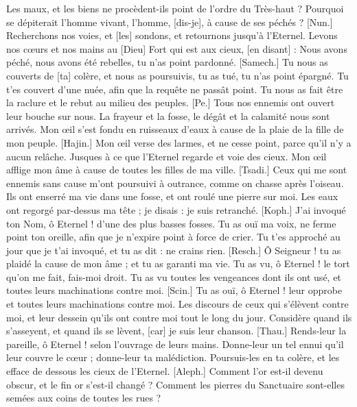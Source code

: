 \begin{multicols}{2}
Les maux, et les biens ne procèdent-ils point de l’ordre du Très-haut ?
Pourquoi se dépiterait l’homme vivant, l’homme, [dis-je], à cause de ses péchés ?
[Nun.] Recherchons nos voies, et [les] sondons, et retournons jusqu’à l’Eternel.
Levons nos cœurs et nos mains au [Dieu] Fort qui est aux cieux, [en disant] :
Nous avons péché, nous avons été rebelles, tu n’as point pardonné.
[Samech.] Tu nous as couverts de [ta] colère, et nous as poursuivis, tu as tué, tu n’as point épargné.
Tu t’es couvert d’une nuée, afin que la requête ne passât point.
Tu nous as fait être la raclure et le rebut au milieu des peuples.
[Pe.] Tous nos ennemis ont ouvert leur bouche sur nous.
La frayeur et la fosse, le dégât et la calamité nous sont arrivés.
Mon œil s’est fondu en ruisseaux d’eaux à cause de la plaie de la fille de mon peuple.
[Hajin.] Mon œil verse des larmes, et ne cesse point, parce qu’il n’y a aucun relâche.
Jusques à ce que l’Eternel regarde et voie des cieux.
Mon œil afflige mon âme à cause de toutes les filles de ma ville.
[Tsadi.] Ceux qui me sont ennemis sans cause m’ont poursuivi à outrance, comme on chasse après l’oiseau.
Ils ont enserré ma vie dans une fosse, et ont roulé une pierre sur moi.
Les eaux ont regorgé par-dessus ma tête ; je disais : je suis retranché.
[Koph.] J’ai invoqué ton Nom, ô Eternel ! d’une des plus basses fosses.
Tu as ouï ma voix, ne ferme point ton oreille, afin que je n’expire point à force de crier.
Tu t’es approché au jour que je t’ai invoqué, et tu as dit : ne crains rien.
[Resch.] Ô Seigneur ! tu as plaidé la cause de mon âme ; et tu as garanti ma vie.
Tu as vu, ô Eternel ! le tort qu’on me fait, fais-moi droit.
Tu as vu toutes les vengeances dont ils ont usé, et toutes leurs machinations contre moi.
[Scin.] Tu as ouï, ô Eternel ! leur opprobe et toutes leurs machinations contre moi.
Les discours de ceux qui s’élèvent contre moi, et leur dessein qu’ils ont contre moi tout le long du jour.
Considère quand ils s’asseyent, et quand ils se lèvent, [car] je suis leur chanson.
[Thau.] Rends-leur la pareille, ô Eternel ! selon l’ouvrage de leurs mains.
Donne-leur un tel ennui qu’il leur couvre le cœur ; donne-leur ta malédiction.
Poursuis-les en ta colère, et les efface de dessous les cieux de l’Eternel.
\VerseOne{}[Aleph.] Comment l’or est-il devenu obscur, et le fin or s’est-il changé ? Comment les pierres du Sanctuaire sont-elles semées aux coins de toutes les rues ?

\end{multicols}
